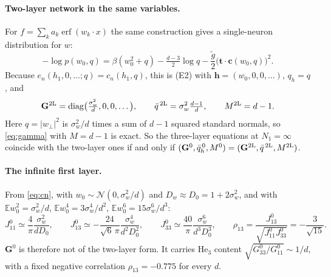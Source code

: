 \documentclass[11pt,a4paper]{article}
\newcommand{\E}{\mathbb{E}}
\newcommand{\erf}{\operatorname{erf}}
\begin{document}
\paragraph{Two-layer network in the same variables.}
For $f=\sum_ka_k\erf(w_k\cdot x)$ the same construction gives a single-neuron distribution for $w$:
\begin{equation}
  -\log p(w_0,q)=\beta(w_0^2+q)-\tfrac{d-3}{2}\log q-\frac{\tilde g}{2}\big(\mathbf t\cdot\mathbf c(w_0,q)\big)^2 .
\end{equation}
Because $e_n(h_1,0,\dots;q)=c_n(h_1,q)$, this is (E2) with $\mathbf h=(w_0,0,0,\dots)$, $q_h=q$, and
\begin{equation}
  \mathbf G^{\rm 2L}=\mathrm{diag}\big(\tfrac{\sigma_w^2}{d},0,0,\dots\big),\qquad
  \bar q^{\,\rm 2L}=\sigma_w^2\tfrac{d-1}{d},\qquad M^{\rm 2L}=d-1 .
\end{equation}
Here $q=|w_\perp|^2$ is $\sigma_w^2/d$ times a sum of $d-1$ squared standard normals, so \eqref{eq:gamma} with $M=d-1$ is exact.
So the three-layer equations at $N_1=\infty$ coincide with the two-layer ones if and only if
$(\mathbf G^0,\bar q^{\,0}_h,M^0)=(\mathbf G^{\rm 2L},\bar q^{\,\rm 2L},M^{\rm 2L})$.

\paragraph{The infinite first layer.}
From \eqref{eq:cn}, with $w_0\sim\mathcal N(0,\sigma_w^2/d)$ and $D_w\approx D_0=1+2\sigma_w^2$, and with
$\E w_0^2=\sigma_w^2/d$, $\E w_0^4=3\sigma_w^4/d^2$, $\E w_0^6=15\sigma_w^6/d^3$:
\begin{equation}
  J^0_{11}\simeq\frac{4}{\pi}\frac{\sigma_w^2}{dD_0},\qquad
  J^0_{13}\simeq-\frac{24}{\sqrt6\,\pi}\frac{\sigma_w^4}{d^2D_0^2},\qquad
  J^0_{33}\simeq\frac{40}{\pi}\frac{\sigma_w^6}{d^3D_0^3},\qquad
  \rho_{13}=\frac{J^0_{13}}{\sqrt{J^0_{11}J^0_{33}}}=-\frac{3}{\sqrt{15}} .
\end{equation}
$\mathbf G^0$ is therefore not of the two-layer form.
It carries He$_3$ content $\sqrt{G^0_{33}/G^0_{11}}\sim1/d$, with a fixed negative correlation $\rho_{13}=-0.775$ for every $d$.
\end{document}
